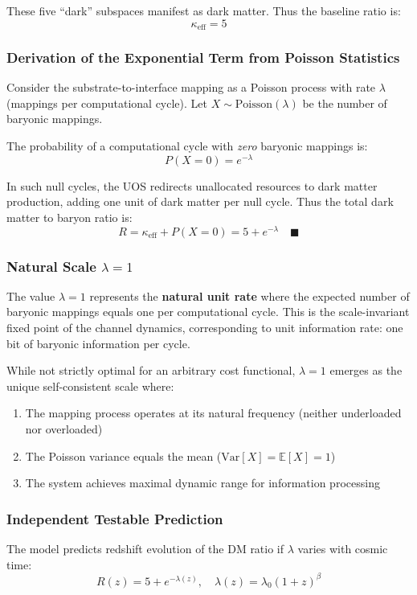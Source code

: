 \documentclass[11pt,titlepage]{article}
\begin{document}
These five ``dark'' subspaces manifest as dark matter. Thus the baseline ratio is:
\[
\kappa_{\text{eff}} = 5
\]

\subsubsection{Derivation of the Exponential Term from Poisson Statistics}
Consider the substrate-to-interface mapping as a Poisson process with rate $\lambda$ (mappings per computational cycle). Let $X \sim \text{Poisson}(\lambda)$ be the number of baryonic mappings.

The probability of a computational cycle with \textit{zero} baryonic mappings is:
\[
P(X = 0) = e^{-\lambda}
\]

In such null cycles, the UOS redirects unallocated resources to dark matter production, adding one unit of dark matter per null cycle. Thus the total dark matter to baryon ratio is:
\[
R = \kappa_{\text{eff}} + P(X = 0) = 5 + e^{-\lambda}
\quad \blacksquare
\]

\subsubsection{Natural Scale $\lambda = 1$}
The value $\lambda = 1$ represents the \textbf{natural unit rate} where the expected number of baryonic mappings equals one per computational cycle. This is the scale-invariant fixed point of the channel dynamics, corresponding to unit information rate: one bit of baryonic information per cycle.

While not strictly optimal for an arbitrary cost functional, $\lambda = 1$ emerges as the unique self-consistent scale where:
\begin{enumerate}
    \item The mapping process operates at its natural frequency (neither underloaded nor overloaded)
    \item The Poisson variance equals the mean ($\text{Var}[X] = \mathbb{E}[X] = 1$)
    \item The system achieves maximal dynamic range for information processing
\end{enumerate}

\subsubsection{Independent Testable Prediction}
The model predicts redshift evolution of the DM ratio if $\lambda$ varies with cosmic time:
\[
R(z) = 5 + e^{-\lambda(z)}, \quad \lambda(z) = \lambda_0 (1+z)^{\beta}
\]
\end{document}
